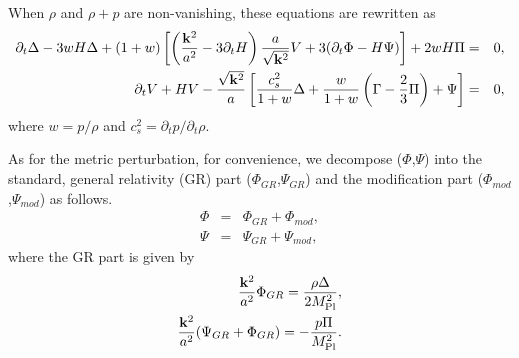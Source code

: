 When $\rho$ and $\rho+p$ are non-vanishing, these equations are
rewritten as
%
\begin{eqnarray}
 \partial_t\Delta - 3wH\Delta + (1+w)
  \left[\left(\frac{{\bf k}^2}{a^2}-3\partial_tH\right)
   \frac{a}{\sqrt{{\bf k}^2}}V+3(\partial_t\Phi-H\Psi)\right]
  +2wH\Pi & = & 0,\nonumber\\
 \partial_t V + HV - \frac{\sqrt{{\bf k}^2}}{a}
  \left[\frac{c_s^2}{1+w}\Delta+\frac{w}{1+w}
   \left(\Gamma-\frac{2}{3}\Pi\right)+\Psi\right] & = & 0, 
  \label{eqn:conservation-perturbation}
  \nonumber\\
\end{eqnarray}
where $w=p/\rho$ and $c_s^2=\partial_t p/\partial_t\rho$. 


As for the metric perturbation, for convenience, we decompose
($\Phi$,$\Psi$) into the standard, general relativity (GR) part
($\Phi_{GR}$,$\Psi_{GR}$) and the modification part
($\Phi_{mod}$,$\Psi_{mod}$) as follows. 
%
\begin{eqnarray}
 \Phi & = & \Phi_{GR} + \Phi_{mod}, \nonumber\\
 \Psi & = & \Psi_{GR} + \Psi_{mod},
  \label{eqn:GR-plus-mod}
\end{eqnarray}
where the GR part is given by 
%
\begin{eqnarray}
 \frac{{\bf k}^2}{a^2}\Phi_{GR} = 
  \frac{\rho\Delta}{2M_{\rm Pl}^2}, \nonumber\\
 \frac{{\bf k}^2}{a^2}(\Psi_{GR}+\Phi_{GR}) = 
  -\frac{p\Pi}{M_{\rm Pl}^2}. 
  \label{eqn:GRpart-def}
\end{eqnarray}


